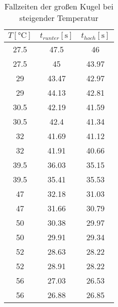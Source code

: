 \begin{table}[!htp]
  \centering
  \begin{tabular}{|c|c|c|}
    \hline
    $T [\unit{\degreeCelsius}]$ & $t_{runter} [\unit{\second}]$ & $t_{hoch} [\unit{\second}]$\\
    \hline \hline
    27.5 & 47.5 & 46\\
    27.5 & 45 & 43.97\\
    29 & 43.47 & 42.97\\
    29 & 44.13 & 42.81\\
    30.5 & 42.19 & 41.59\\
    30.5 & 42.4 & 41.34\\
    32 & 41.69 & 41.12\\
    32 & 41.91 & 40.66\\
    39.5 & 36.03 & 35.15\\
    39.5 & 35.41 & 35.53\\
    47 & 32.18 & 31.03\\
    47 & 31.66 & 30.79\\
    50 & 30.38 & 29.97\\
    50 & 29.91 & 29.34\\
    52 & 28.63 & 28.22\\
    52 & 28.91 & 28.22\\
    56 & 27.03 & 26.53\\
    56 & 26.88 & 26.85\\
  \end{tabular}
  \label{tabellegkt}
  \caption{Fallzeiten der großen Kugel bei steigender Temperatur}
\end{table}


